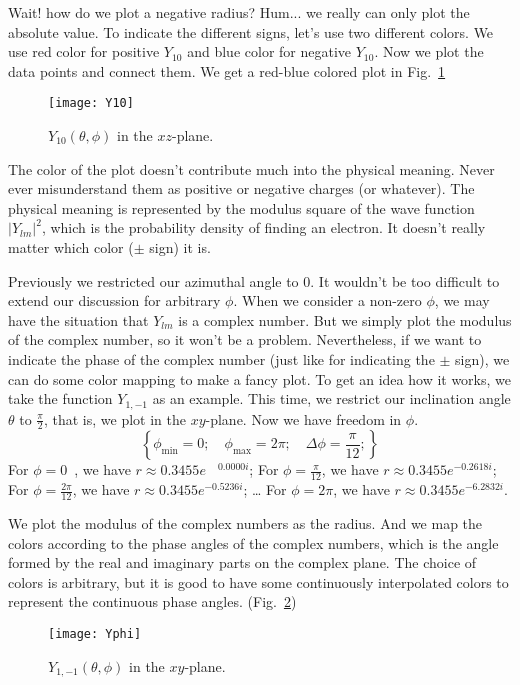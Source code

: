 Wait! how do we plot a negative radius? Hum... we really can only plot the
absolute value. To indicate the different signs, let's use two different colors.
We use red color for positive $Y_{10}$ and blue color for negative $Y_{10}$.
Now we plot the data points and connect them. We get a red-blue colored plot in Fig.~\ref{fig:Y10}
\begin{figure}[h!]
\centering
  \texttt{[image: Y10]}
  \caption{$Y_{10}(\theta,\phi)$ in the $xz$-plane.}
  \label{fig:Y10}
\end{figure}

The color of the plot doesn't contribute much into the physical meaning.
Never ever misunderstand them as positive or negative charges (or whatever). The physical
meaning is represented by the modulus square of the wave function $|Y_{lm}|^2$,
which is the probability density of finding an electron.
It doesn't really matter which color ($\pm$ sign) it is.

Previously we restricted our azimuthal angle to 0. It wouldn't be too difficult
to extend our discussion for arbitrary $\phi$. When we consider a non-zero $\phi$,
we may have the situation that $Y_{lm}$ is a complex number. But we simply
plot the modulus of the complex number, so it won't be a problem. Nevertheless,
if we want to indicate the phase of the complex number (just like for indicating the $\pm$ sign),
we can do some color mapping to make a fancy plot.
To get an idea how it works, we take the function $Y_{1,-1}$ as an example.
This time, we restrict our inclination angle $\theta$ to $\frac{\pi}{2}$, that is,
we plot in the $xy$-plane. Now we have freedom in $\phi$.
\begin{equation} \label{eq:phiGrid}
\left\{ \phi_{\text{min}} = 0;\quad \phi_{\text{max}} = 2\pi;\quad \Delta \phi = \frac{\pi}{12}; \right\}
\end{equation}
For $\phi=0\,\,\,$, we have $r \approx 0.3455 e^{\phantom{-}0.0000i}$;\newline
For $\phi=\frac{\pi}{12}$, we have $r \approx 0.3455 e^{-0.2618i}$;\newline
For $\phi=\frac{2\pi}{12}$, we have $r \approx 0.3455 e^{-0.5236i}$;\newline
\ldots \newline
For $\phi=2\pi$, we have $r \approx 0.3455 e^{-6.2832i}$.

We plot the modulus of the complex numbers as the radius. And we map the
colors according to the phase angles of the complex numbers,
which is the angle formed by the real and imaginary parts on
the complex plane. The choice of colors is arbitrary, but it is good to have some
continuously interpolated colors to represent the continuous phase angles. (Fig.~\ref{fig:Yphi})
\vspace{-0.5em}
\begin{figure}[h!]
\centering
  \texttt{[image: Yphi]}
  \caption{$Y_{1,-1}(\theta,\phi)$ in the $xy$-plane.}
  \label{fig:Yphi}
\end{figure}

